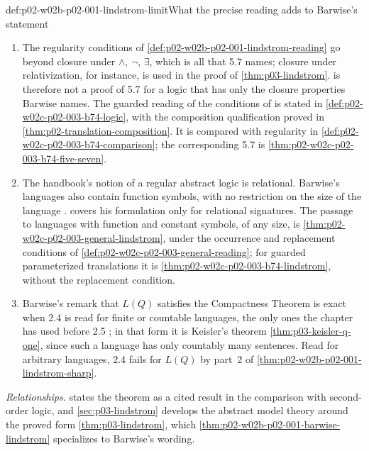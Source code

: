 \begin{hbwarning}{def:p02-w02b-p02-001-lindstrom-limit}{What the precise reading adds to Barwise's statement}
\begin{enumerate}
\item The regularity conditions of
      \cref{def:p02-w02b-p02-001-lindstrom-reading} go beyond closure under
      \(\land\), \(\neg\), \(\exists\), which is all that 5.7 names; closure
      under relativization, for instance, is used in the proof of
      \cref{thm:p03-lindstrom}.  
      is therefore not a proof of 5.7 for a logic that has only the closure
      properties Barwise names.  The guarded reading of the conditions of
      \cite{Barwise1974Axioms} is stated in
      \cref{def:p02-w02c-p02-003-b74-logic}, with the composition
      qualification proved in \cref{thm:p02-translation-composition}.
      It is compared with regularity in
      \cref{def:p02-w02c-p02-003-b74-comparison}; the corresponding 5.7
      is \cref{thm:p02-w02c-p02-003-b74-five-seven}.
\item The handbook's notion of a regular abstract logic is relational.
      Barwise's languages also contain function symbols, with no
      restriction on the size of the language
      \cite[ch.~A.1, \S3, p.~17]{Barwise1977FirstOrder}.
       covers his formulation
      only for relational signatures.  The passage to languages with
      function and constant symbols, of any size, is
      \cref{thm:p02-w02c-p02-003-general-lindstrom}, under the occurrence
      and replacement conditions of
      \cref{def:p02-w02c-p02-003-general-reading}; for guarded
      parameterized translations it is
      \cref{thm:p02-w02c-p02-003-b74-lindstrom},
      without the replacement condition.
\item Barwise's remark that \(L(Q)\) satisfies the Compactness Theorem is
      exact when 2.4 is read for finite or countable languages, the only
      ones the chapter has used before 2.5
      \cite[ch.~A.1, \S2, p.~10]{Barwise1977FirstOrder}; in that form it is
      Keisler's theorem \cref{thm:p03-keisler-q-one}, since such a language
      has only countably many sentences.  Read for arbitrary languages, 2.4
      fails for \(L(Q)\) by part~2 of
      \cref{thm:p02-w02b-p02-001-lindstrom-sharp}.
\end{enumerate}
\end{hbwarning}

\emph{Relationships.}   states the theorem as a cited
result in the comparison with second-order logic, and
\cref{sec:p03-lindstrom} develops the abstract model theory around the
proved form \cref{thm:p03-lindstrom}, which
\cref{thm:p02-w02b-p02-001-barwise-lindstrom} specializes to Barwise's
wording.
